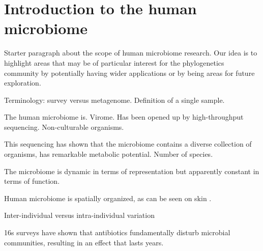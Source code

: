 \documentclass{amsart}
\begin{document}
\section{Introduction to the human microbiome}

Starter paragraph about the scope of human microbiome research.
Our idea is to highlight areas that may be of particular interest for the phylogenetics community by potentially having wider applications or by being areas for future exploration.

Terminology: survey versus metagenome.
Definition of a single sample.

The human microbiome is.
Virome.
Has been opened up by high-throughput sequencing.
Non-culturable organisms.

This sequencing has shown that the microbiome contains a diverse collection of organisms, has remarkable metabolic potential.
Number of species.
\cite{qin2010human}

The microbiome is dynamic in terms of representation but apparently constant in terms of function.
\cite{hmp2012structure}

Human microbiome is spatially organized, as can be seen on skin \cite{grice2009topographical}.

Inter-individual versus intra-individual variation \cite{hmp2012structure}

16s surveys have shown that antibiotics fundamentally disturb microbial communities, resulting in an effect that lasts years.
\cite{jernberg2007long,dethlefsen2008pervasive,jakobsson2010short,dethlefsen2011incomplete}
\end{document}
